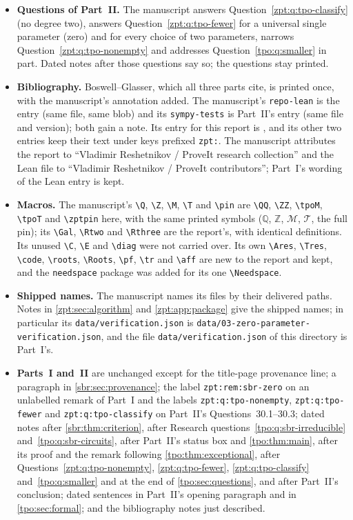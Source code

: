 \documentclass[11pt,letterpaper]{article}
\numberwithin{equation}{section}
\theoremstyle{definition}
\theoremstyle{remark}
\DeclareMathOperator{\Gal}{Gal}
\newcommand{\QQ}{\mathbb Q}
\newcommand{\ZZ}{\mathbb Z}
\newcommand{\Rtwo}{R_{2,f}}
\newcommand{\Rthree}{R_{3,f}}
\newcommand{\src}[1]{\texttt{\nolinkurl{#1}}}
\newcommand{\tpoM}{\mathcal M}
\newcommand{\tpoT}{\mathcal T}
\newcommand{\zptpin}{\texttt{1156651a9417231a9a54442b420f099ee85ae7fe}}
\DeclareMathOperator{\pf}{pf}
\DeclareMathOperator{\tr}{tr}
\DeclareMathOperator{\aff}{aff}
\DeclareMathOperator{\Roots}{Roots}
\newcommand{\Ares}{M_f}\newcommand{\Tres}{T_f}
\newcommand{\code}[1]{\texttt{\small #1}}
\newcommand{\roots}[1]{\Roots_K(#1)}
\begin{document}
\begin{itemize}
nothing in it is withdrawn; dated notes there say what changed.
\item \textbf{Questions of Part~II.} The manuscript answers
Question~\ref{zpt:q:tpo-classify} (no degree two), answers
Question~\ref{zpt:q:tpo-fewer} for a universal single parameter (zero) and
for every choice of two parameters, narrows
Question~\ref{zpt:q:tpo-nonempty} and addresses
Question~\ref{tpo:q:smaller} in part. Dated notes after those questions
say so; the questions stay printed.
\item \textbf{Bibliography.} Boswell--Glasser, which all three parts cite,
is printed once, with the manuscript's annotation added. The manuscript's
\src{repo-lean} is the entry \cite{repo-decision} (same file, same blob)
and its \src{sympy-tests} is Part~II's entry \cite{tpo:sympy-tests} (same
file and version); both gain a note. Its entry for this report is
\cite{zpt:repo-report}, and its other two entries keep their text under
keys prefixed \src{zpt:}. The manuscript attributes the report to
``Vladimir Reshetnikov / ProveIt research collection'' and the Lean file to
``Vladimir Reshetnikov / ProveIt contributors''; Part~I's wording of the
Lean entry is kept.
\item \textbf{Macros.} The manuscript's \verb|\Q|, \verb|\Z|, \verb|\M|,
\verb|\T| and \verb|\pin| are \verb|\QQ|, \verb|\ZZ|, \verb|\tpoM|,
\verb|\tpoT| and \verb|\zptpin| here, with the same printed symbols
($\QQ$, $\ZZ$, $\tpoM$, $\tpoT$, the full pin); its \verb|\Gal|,
\verb|\Rtwo| and \verb|\Rthree| are the report's, with identical
definitions. Its unused \verb|\C|, \verb|\E| and \verb|\diag| were not
carried over. Its own \verb|\Ares|, \verb|\Tres|, \verb|\code|,
\verb|\roots|, \verb|\Roots|, \verb|\pf|, \verb|\tr| and \verb|\aff| are
new to the report and kept, and the \src{needspace} package was added for
its one \verb|\Needspace|.
\item \textbf{Shipped names.} The manuscript names its files by their
delivered paths. Notes in \cref{zpt:sec:algorithm} and
\cref{zpt:app:package} give the shipped names; in particular its
\src{data/verification.json} is
\src{data/03-zero-parameter-verification.json}, and the file
\src{data/verification.json} of this directory is Part~I's.
\item \textbf{Parts~I and~II} are unchanged except for the title-page
provenance line; a paragraph in \cref{sbr:sec:provenance}; the label
\src{zpt:rem:sbr-zero} on an unlabelled remark of Part~I and the labels
\src{zpt:q:tpo-nonempty}, \src{zpt:q:tpo-fewer} and
\src{zpt:q:tpo-classify} on Part~II's Questions~30.1--30.3; dated notes
after \cref{sbr:thm:criterion}, after Research
questions~\ref{tpo:q:sbr-irreducible} and~\ref{tpo:q:sbr-circuits}, after
Part~II's status box and \cref{tpo:thm:main}, after its proof and the
remark following \cref{tpo:thm:exceptional}, after
Questions~\ref{zpt:q:tpo-nonempty}, \ref{zpt:q:tpo-fewer},
\ref{zpt:q:tpo-classify} and~\ref{tpo:q:smaller} and at the end of
\cref{tpo:sec:questions}, and after Part~II's conclusion; dated sentences
in Part~II's opening paragraph and in \cref{tpo:sec:formal}; and the
bibliography notes just described.
\end{itemize}
\end{document}
